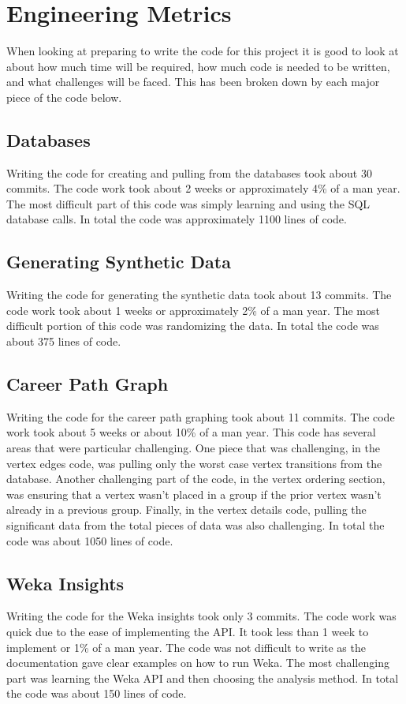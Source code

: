 \section{Engineering Metrics}
\label{sect:engineering-metrics}
When looking at preparing to write the code for this project it is good to look
at about how much time will be required, how much code is needed to be written,
and what challenges will be faced.  This has been broken down by each major
piece of the code below.
\subsection{Databases}
Writing the code for creating and pulling from the databases took about 30
commits.  The code work took about 2 weeks or approximately 4\% of a man year. 
The most difficult part of this code was simply learning and using the SQL
database calls.  In total the code was approximately 1100 lines of code.
\subsection{Generating Synthetic Data}
Writing the code for generating the synthetic data took about 13 commits.  The
code work took about 1 weeks or approximately 2\% of a man year.  The most
difficult portion of this code was randomizing the data.  In total the code was
about 375 lines of code.
\subsection{Career Path Graph}
Writing the code for the career path graphing took about 11 commits.  The code
work took about 5 weeks or about 10\% of a man year.  This code has several
areas that were particular challenging.  One piece that was challenging, in the
vertex edges code, was pulling only the worst case vertex transitions from
the database.  Another challenging part of the code, in the vertex ordering
section, was ensuring that a vertex wasn't placed in a group if the prior vertex
wasn't already in a previous group.  Finally, in the vertex details code, pulling
the significant data from the total pieces of data was also challenging.  In
total the code was about 1050 lines of code.
\subsection{Weka Insights}
Writing the code for the Weka insights took only 3 commits.  The code work was
quick due to the ease of implementing the API.  It took less than 1 week to
implement or 1\% of a man year.  The code was not difficult to write as the
documentation gave clear examples on how to run Weka.  The most challenging part
was learning the Weka API and then choosing the analysis method.  In total the
code was about 150 lines of code.
